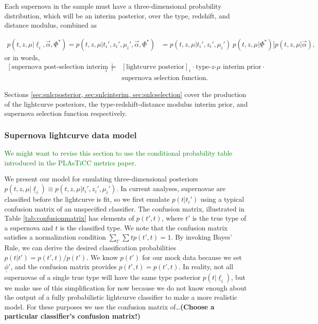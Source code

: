 \documentclass[12pt, twocolumn]{emulateapj}
\newcommand{\textul}{\underline}
\newcommand{\tkAM}[1]{\textcolor{green}{#1}}  %
\begin{document}
Each supernova in the sample must have a three-dimensional probability distribution, which will be an interim posterior, over the type, redshift, and distance modulus, combined as

\begin{widetext}
\begin{align}
    \label{eq:fullsnlcpdf}
    p(t, z, \mu | \textul{\ell}_{i}, \vec{\alpha}, \textul{\Phi}^{*}) = p(t, z, \mu | t_{i}', z_{i}', \mu_{i}', \vec{\alpha}, \textul{\Phi}^{*}) &= p(t, z, \mu | t_{i}', z_{i}', \mu_{i}')\ p(t, z, \mu | \textul{\Phi}^{*})] p(t, z, \mu | \vec{\alpha}),
\end{align}
 or in words,
\begin{eqnarray}
    \label{eq:fullsnlcpdfwords}
    [\textrm{supernova post-selection interim posterior}]_{i} &=& [\textrm{lightcurve posterior}]_{i}\ \boldsymbol{\cdot}\ \textrm{type-$z$-$\mu$ interim prior}\ \boldsymbol{\cdot}\nonumber \\ &&\textrm{supernova selection function}.
\end{eqnarray}

\end{widetext}

Sections \ref{sec:snlcposterior, sec:snlcinterim, sec:snlcselection} cover the production of the lightcurve posteriors, the type-redshift-distance modulus interim prior, and supernova selection function respectively.

\subsubsection{Supernova lightcurve data model}
\label{sec:snlcposterior}

\tkAM{We might want to revise this section to use the conditional probability table introduced in the PLAsTiCC metrics paper.}

We present our model for emulating three-dimensional posteriors $p(t, z, \mu | \textul{\ell}_{i})\equiv p(t, z, \mu | t_{i}', z_{i}', \mu_{i}')$.  
In current analyses, supernovae are classified before the lightcurve is fit, so we first emulate $p(t | t_{i}')$ using a typical confusion matrix of an unspecified classifier.  
The confusion matrix, illustrated in Table \ref{tab:confusionmatrix} has elements of $p(t', t)$, where $t'$ is the true type of a supernova and $t$ is the classified type.  
We note that the confusion matrix satisfies a normalization condition $\sum_{t'}\sum{t}p(t', t)=1$.  
By invoking Bayes' Rule, we can derive the desired classification probabilities $p(t | t')=p(t', t)/p(t')$.  
We know $p(t')$ for our mock data because we set $\textul{\phi}'$, and the confusion matrix provides $p(t', t)=p(t', t)$.  
In reality, not all supernovae of a single true type will have the same type posterior $p(t | \textul{\ell}_{i})$, but we make use of this simplification for now because we do not know enough about the output of a fully probabilistic lightcurve classifier to make a more realistic model.  
For these purposes we use the confusion matrix of\dots \textbf{(Choose a particular classifier's confusion matrix!)}
\end{document}
